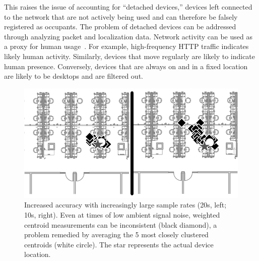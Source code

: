 This raises the issue of accounting for ``detached devices,'' devices left connected to the network that are not actively being used and can therefore be falsely registered as occupants. The problem of detached devices can be addressed through analyzing packet and localization data. Network activity can be used as a proxy for human usage~\cite{Nedevschi2009}. For example, high-frequency HTTP traffic indicates likely human activity. Similarly, devices that move regularly are likely to indicate human presence. Conversely, devices that are always on and in a fixed location are likely to be desktops and are filtered out.



\begin{figure}[htb]
\begin{center}
\includegraphics[width=.7\linewidth]{figs/samplesize}
\end{center}
\caption{Increased accuracy with increasingly large sample rates (20s, left; 10s, right). Even at times of low ambient signal noise, weighted centroid measurements can be inconsistent (black diamond), a problem remedied by averaging the 5 most closely clustered centroids (white circle). The star represents the actual device location.}
\end{figure}
